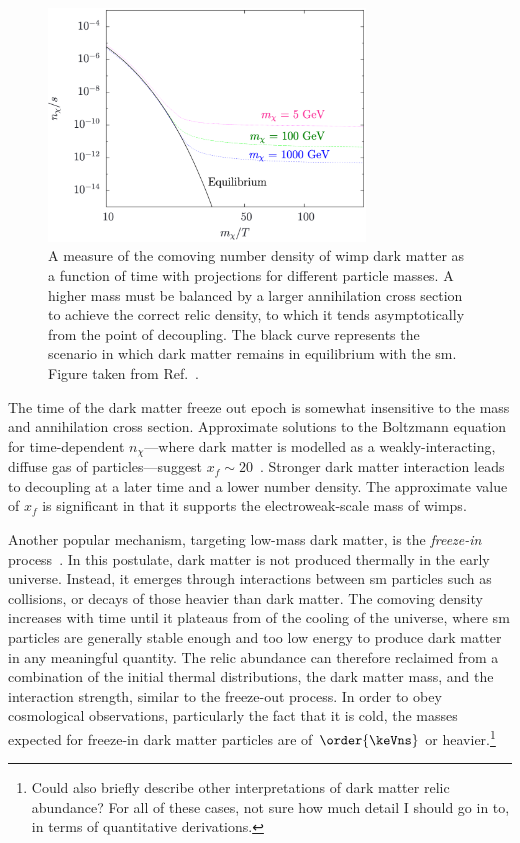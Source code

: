 \begin{figure}[htbp]
    \centering
    \includegraphics[width=0.75\textwidth]{figures/dm_abundance.png}
    \caption[A measure of the comoving number density of \acrshort{wimp} dark matter as a function of time with projections for different particle masses]{A measure of the comoving number density of \acrshort{wimp} dark matter as a function of time with projections for different particle masses. A higher mass must be balanced by a larger annihilation cross section to achieve the correct relic density, to which it tends asymptotically from the point of decoupling. The black curve represents the scenario in which dark matter remains in equilibrium with the \acrlong{sm}. Figure taken from Ref.~.}
    \label{fig:theory_dm_abundance}
\end{figure}

The time of the dark matter freeze out epoch is somewhat insensitive to the mass and annihilation cross section. Approximate solutions to the Boltzmann equation for time-dependent $n_{\chi}$---where dark matter is modelled as a weakly-interacting, diffuse gas of particles---suggest $x_f \sim 20$~\cite{Lisanti:2016jxe,Bender:2012gc}. Stronger dark matter interaction leads to decoupling at a later time and a lower number density. The approximate value of $x_f$ is significant in that it supports the electroweak-scale mass of \glspl{wimp}.

Another popular mechanism, targeting low-mass dark matter, is the \emph{freeze-in} process~\cite{Hall:2009bx,Krnjaic:2017tio}. In this postulate, dark matter is not produced thermally in the early universe. Instead, it emerges through interactions between \acrshort{sm} particles such as collisions, or decays of those heavier than dark matter. The comoving density increases with time until it plateaus from of the cooling of the universe, where \acrshort{sm} particles are generally stable enough and too low energy to produce dark matter in any meaningful quantity. The relic abundance can therefore reclaimed from a combination of the initial thermal distributions, the dark matter mass, and the interaction strength, similar to the freeze-out process. In order to obey cosmological observations, particularly the fact that it is cold, the masses expected for freeze-in dark matter particles are of $\order{\keVns}$ or heavier.\footnote{Could also briefly describe other interpretations of dark matter relic abundance? For all of these cases, not sure how much detail I should go in to, in terms of quantitative derivations.}

